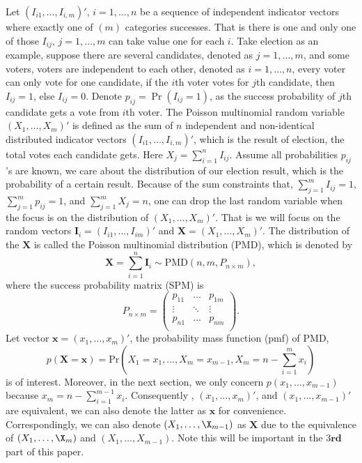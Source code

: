 \documentclass[12pt]{article}
\newcommand{\PMD}{\textrm{PMD}}
\begin{document}
Let $(I_{i1}, \ldots, I_{i,m})'$, $i = 1,\dots,n$ be a sequence of independent indicator vectors where exactly one of $(m)$ categories successes. That is there is one and only one of those $I_{ij}$, $j=1,\ldots, m$ can take value one for each $i$. Take election as an example, suppose there are several candidates, denoted as $j = 1,\dots,m$, and some voters, voters are independent to each other, denoted as $i = 1,\dots,n$, every voter can only vote for one candidate, if the $i$th voter votes for $j$th candidate, then $I_{ij} = 1$, else $I_{ij} = 0$.  Denote $p_{ij} = \Pr(I_{ij} = 1)$, as the success probability of $j$th candidate gets a vote from $i$th voter. The Poisson multinomial random variable $(X_1, \dots, X_m)' $ is defined as the sum of $n$ independent and non-identical distributed indicator vectors $(I_{i1}, \ldots, I_{i,m})'$, which is the result of election, the total votes each candidate gets. Here $X_j=\sum_{i=1}^{n}I_{ij}$. Assume all probabilities $p_{ij}$'s are known, we care about the distribution of our election result, which is the probability of a certain result. Because of the sum constraints that, $\sum_{j=1}^{m} I_{ij}= 1$, $\sum_{j=1}^{m} p_{ij}= 1$, and $\sum_{j=1}^{m} X_{j}= n$, one can drop the last random variable when the focus is on the distribution of $(X_1, \ldots, X_m)'$. That is we will focus on the random vectors $\boldsymbol{I}_i=(I_{i1}, \ldots, I_{im})'$ and $\boldsymbol{X}=(X_1, \ldots, X_m)'$. The distribution of the $\boldsymbol{X}$ is called the Poisson multinomial distribution (PMD), which is denoted by
$$\boldsymbol{X}  = \sum_{i = 1}^n \boldsymbol{I}_i \sim \PMD(n,m,P_{n\times m}),$$
where the success probability matrix (SPM) is
\begin{equation*}
P_{n \times m} = \begin{pmatrix}
p_{11} &  \dots & p_{1m} \\
\vdots & \ddots & \vdots \\
p_{n1} &  \dots & p_{nm} \\
\end{pmatrix}.
\end{equation*}
Let vector $\boldsymbol{x} = (x_1,\dots,x_m)'$, the probability mass function (pmf) of PMD,
$$p(\boldsymbol{X}=\boldsymbol{x}) = \text{Pr} \left( X_1 = x_1, \dots, X_m = x_{m-1}, X_{m} = n-\sum_{i=1}^{m}x_i \right)$$
is of interest. Moreover, in the next section, we only concern $p(x_1, \dots, x_{m-1})$ because $x_{m} = n-\sum_{i=1}^{m-1}x_i $. Consequently , $(x_{1},\dots,x_m)'$, and $(x_{1},\dots,x_{m-1})'$ are equivalent, we can also denote the latter as $\boldsymbol{x}$ for convenience. Correspondingly, we can also denote $(X_1,\dots,\X_{m-1})$ as $\boldsymbol{X}$ due to the equivalence of  $(X_1,\dots,\X_m)$ and $(X_1,\dots,X_{m-1})$. Note this will be  important in the 3$\textbf{rd}$ part of this paper.\\
\end{document}
